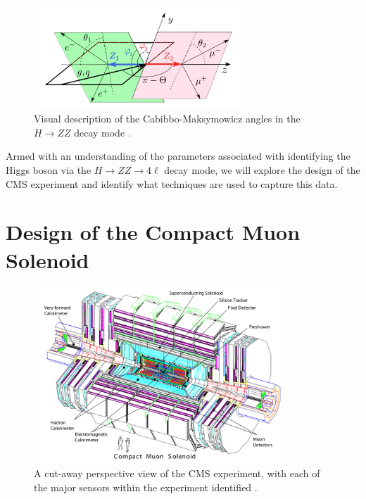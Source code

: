 \documentclass[12pt]{article}
\begin{document}
\begin{figure}[h!]
\centering
\includegraphics[width=0.7\textwidth]{images/HtoZZ_angles}
\caption{Visual description of the Cabibbo-Maksymowicz angles in the $H \to ZZ$ decay mode \cite{higgs_angles}.}
\label{angle_fig}
\end{figure}
\noindent
Armed with an understanding of the parameters associated with identifying the Higgs boson via the $H \to ZZ \to 4 \ell$ decay mode, we will explore the design of the CMS experiment and identify what techniques are used to capture this data.

\section{Design of the Compact Muon Solenoid}

\begin{figure}[H]
\centering
\includegraphics[width = 0.85\textwidth]{images/cms_persp}
\caption{A cut-away perspective view of the CMS experiment, with each of the major sensors within the experiment identified \cite{cms_design}.}
\label{cms_persp}
\end{figure}
\end{document}

